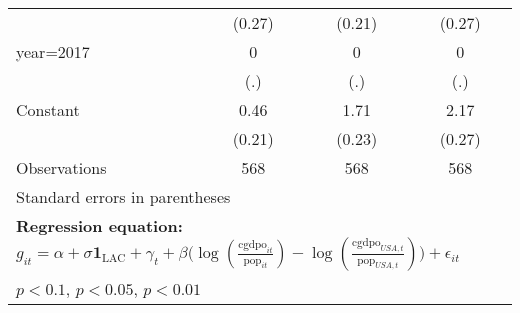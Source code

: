 \begin{table}[htbp]
\begin{tabular}{l*{3}{c}}
                &   (0.27)         &   (0.21)         &   (0.27)         \\
\addlinespace
year=2017       &        0         &        0         &        0         \\
                &      (.)         &      (.)         &      (.)         \\
\addlinespace
Constant        &     0.46\sym{**} &     1.71\sym{***}&     2.17\sym{***}\\
                &   (0.21)         &   (0.23)         &   (0.27)         \\
\midrule
Observations    &      568         &      568         &      568         \\
\bottomrule
\multicolumn{4}{l}{\footnotesize Standard errors in parentheses}\\
\multicolumn{4}{l}{\footnotesize \textbf{Regression equation:} \(g_{it} = \alpha + \sigma \mathbf{1}_{\textrm{LAC}} + \gamma_t + \beta \big(\log (\frac{\textrm{cgdpo}_{it}}{\textrm{pop}_{it}} ) - \log (\frac{\textrm{cgdpo}_{USA,t}}{\textrm{pop}_{USA,t}}  ) \big) + \epsilon_{it}\)}\\
\multicolumn{4}{l}{\footnotesize \sym{*} \(p<0.1\), \sym{**} \(p<0.05\), \sym{***} \(p<0.01\)}\\
\end{tabular}
\end{table}
